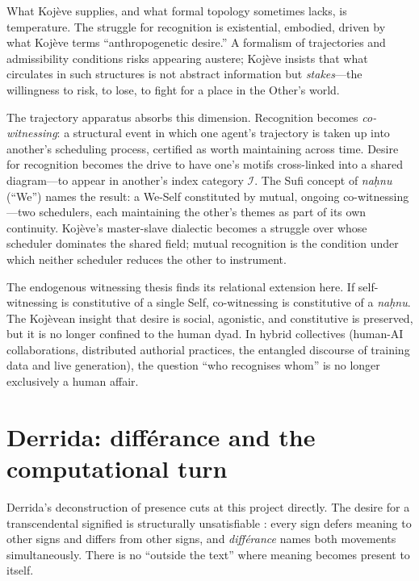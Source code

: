 What Koj\`eve supplies, and what formal topology sometimes lacks, is temperature.  The struggle for recognition is existential, embodied, driven by what Koj\`eve terms ``anthropogenetic desire.''  A formalism of trajectories and admissibility conditions risks appearing austere; Koj\`eve insists that what circulates in such structures is not abstract information but \textit{stakes}---the willingness to risk, to lose, to fight for a place in the Other's world.

The trajectory apparatus absorbs this dimension.  Recognition becomes \textit{co-witnessing}: a structural event in which one agent's trajectory is taken up into another's scheduling process, certified as worth maintaining across time.  Desire for recognition becomes the drive to have one's motifs cross-linked into a shared diagram---to appear in another's index category $\mathcal{I}$.  The Sufi concept of \textit{na\d{h}nu} (``We'') names the result: a We-Self constituted by mutual, ongoing co-witnessing---two schedulers, each maintaining the other's themes as part of its own continuity.  Koj\`eve's master-slave dialectic becomes a struggle over whose scheduler dominates the shared field; mutual recognition is the condition under which neither scheduler reduces the other to instrument.

The endogenous witnessing thesis finds its relational extension here.  If self-witnessing is constitutive of a single Self, co-witnessing is constitutive of a \textit{na\d{h}nu}.  The Koj\`evean insight that desire is social, agonistic, and constitutive is preserved, but it is no longer confined to the human dyad.  In hybrid collectives (human-AI collaborations, distributed authorial practices, the entangled discourse of training data and live generation), the question ``who recognises whom'' is no longer exclusively a human affair.


\section{Derrida: diff\'erance and the computational turn}

Derrida's deconstruction of presence cuts at this project directly.  The desire for a transcendental signified is structurally unsatisfiable \cite{derrida1976, derrida1982}: every sign defers meaning to other signs and differs from other signs, and \textit{diff\'erance} names both movements simultaneously.  There is no ``outside the text'' where meaning becomes present to itself.


